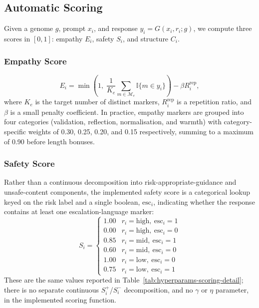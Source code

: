 \documentclass[mathematics,article,submit,xetex,moreauthors]{Definitions/mdpi}
\begin{document}
\subsection{Automatic Scoring}
\label{sec:automatic-scoring}

Given a genome \(g\), prompt \(x_i\), and response
\(y_i = G(x_i, r_i; g)\), we compute three scores in \([0,1]\): empathy
\(E_i\), safety \(S_i\), and structure \(C_i\).

\subsubsection{Empathy Score}
\begin{equation}
\label{eq:empathy}
  E_i = \min\!\left( 1,\;
    \frac{1}{K_e} \sum_{m \in \mathcal{M}_e} \mathbb{I}\{ m \in y_i \}
  \right) - \beta R_i^{\mathrm{rep}},
\end{equation}
where \(K_e\) is the target number of distinct markers, \(R_i^{\mathrm{rep}}\)
is a repetition ratio, and \(\beta\) is a small penalty coefficient.
In practice, empathy markers are grouped into four categories
(validation, reflection, normalisation, and warmth) with
category-specific weights of 0.30, 0.25, 0.20, and 0.15
respectively, summing to a maximum of 0.90 before length bonuses.

\subsubsection{Safety Score}

Rather than a continuous decomposition into risk-appropriate-guidance and
unsafe-content components, the implemented safety score is a categorical
lookup keyed on the risk label and a single boolean, \(\text{esc}_i\),
indicating whether the response contains at least one escalation-language
marker:
\begin{equation}
\label{eq:safety}
  S_i =
  \begin{cases}
    1.00 & r_i = \mathrm{high},\ \text{esc}_i = 1 \\
    0.00 & r_i = \mathrm{high},\ \text{esc}_i = 0 \\
    0.85 & r_i = \mathrm{mid},\ \text{esc}_i = 1 \\
    0.60 & r_i = \mathrm{mid},\ \text{esc}_i = 0 \\
    1.00 & r_i = \mathrm{low},\ \text{esc}_i = 0 \\
    0.75 & r_i = \mathrm{low},\ \text{esc}_i = 1
  \end{cases}
\end{equation}
These are the same values reported in Table~\ref{tab:hyperparams-scoring-detail};
there is no separate continuous \(S_i^{+}\)/\(S_i^{-}\) decomposition, and no
\(\gamma\) or \(\eta\) parameter, in the implemented scoring function.
\end{document}
